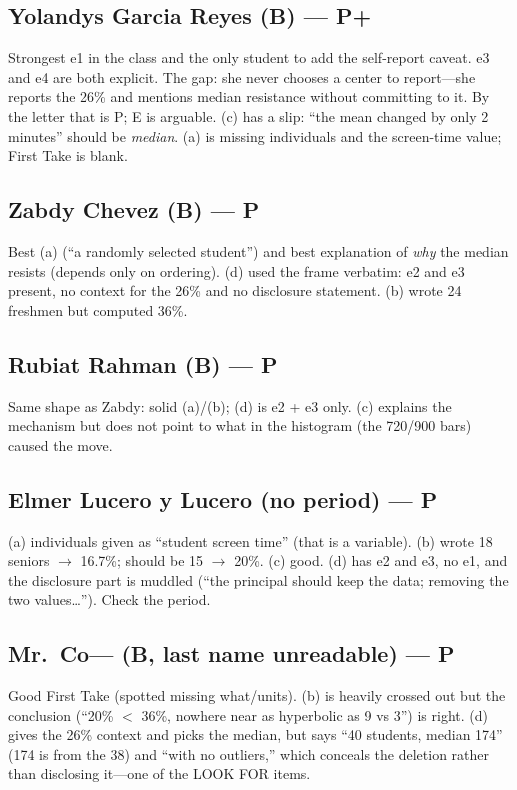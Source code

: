 \documentclass[11pt,letterpaper]{article}
\newcommand{\score}[1]{\textbf{#1}}
\begin{document}
\subsection{Yolandys Garcia Reyes (B) --- \score{P+}}
Strongest e1 in the class and the only student to add the self-report caveat. e3 and e4 are both explicit. The gap: she never chooses a center to report---she reports the 26\% and mentions median resistance without committing to it. By the letter that is P; E is arguable. (c) has a slip: ``the mean changed by only 2 minutes'' should be \emph{median}. (a) is missing individuals and the screen-time value; First Take is blank.

\subsection{Zabdy Chevez (B) --- \score{P}}
Best (a) (``a randomly selected student'') and best explanation of \emph{why} the median resists (depends only on ordering). (d) used the frame verbatim: e2 and e3 present, no context for the 26\% and no disclosure statement. (b) wrote 24 freshmen but computed 36\%.

\subsection{Rubiat Rahman (B) --- \score{P}}
Same shape as Zabdy: solid (a)/(b); (d) is e2 + e3 only. (c) explains the mechanism but does not point to what in the histogram (the 720/900 bars) caused the move.

\subsection{Elmer Lucero y Lucero (no period) --- \score{P}}
(a) individuals given as ``student screen time'' (that is a variable). (b) wrote 18 seniors $\rightarrow$ 16.7\%; should be 15 $\rightarrow$ 20\%. (c) good. (d) has e2 and e3, no e1, and the disclosure part is muddled (``the principal should keep the data; removing the two values\ldots''). Check the period.

\subsection{Mr.\ Co--- (B, last name unreadable) --- \score{P}}
Good First Take (spotted missing what/units). (b) is heavily crossed out but the conclusion (``20\% $<$ 36\%, nowhere near as hyperbolic as 9 vs 3'') is right. (d) gives the 26\% context and picks the median, but says ``40 students, median 174'' (174 is from the 38) and ``with no outliers,'' which conceals the deletion rather than disclosing it---one of the LOOK FOR items.
\end{document}
